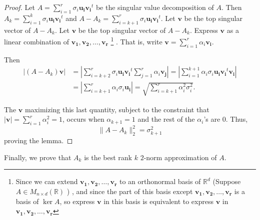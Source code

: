 \begin{proof}
  Let \(A=\sum_{i=1}^{r} \sigma _i \mathbf{u_i} \mathbf{v_i}^t\) be the singular value decomposition of \(A\). Then \(A_k = \sum_{i=1}^k \sigma _i \mathbf{u_i} \mathbf{v_i}^t\) and \(A-A_k = \sum_{i=k+1}^{r}  \sigma _i \mathbf{u_i} \mathbf{v_i}^t\). Let \(\mathbf{v} \) be the top singular vector of \(A - A_k\). Let \(\mathbf{v} \) be the top singular vector of \(A-A_k\). Express \(\mathbf{v} \) as a linear combination of \(\mathbf{v_1}, \mathbf{v_2}, \dots , \mathbf{v_r}\)   \footnote{Since we can extend \(\mathbf{v_1}, \mathbf{v_2}, \dots , \mathbf{v_r}   \) to an orthonormal basis of \(\mathbb{R} ^d\) (Suppose \(A \in M_{n \times d}(\mathbb{R})\) ) , and since the part of this basis except \(\mathbf{v_1}, \mathbf{v_2}, \dots , \mathbf{v_r}\) is a basis of \(\ker A\), so express \(\mathbf{v} \) in this basis is equivalent to express \(\mathbf{v} \) in \(\mathbf{v_1}, \mathbf{v_2}, \dots , \mathbf{v_r}\)    } . That is, write \(\mathbf{v} = \sum_{i=1}^{r} \alpha _i \mathbf{v_i}  \).
  
  Then
  \begin{align*}
    \vert (A-A_k)\mathbf{v}  \vert &= \left\vert \sum_{i=k+2}^{r}\sigma _i \mathbf{u_i} \mathbf{v_i}^t \sum_{j=1}^{r} \alpha _i \mathbf{v_j}      \right\vert = \left\vert \sum_{i=1}^{k+1} \alpha _i \sigma _i \mathbf{u_i} \mathbf{v_i}^t \mathbf{v_i}    \right\vert  \\
    &= \left\vert \sum_{i=k+1}^{r} \alpha _i \sigma _i \mathbf{u_i}   \right\vert = \sqrt{\sum_{i=k+1}^r \alpha _i^2\sigma _i^2 }. 
  \end{align*}         

  The \(\mathbf{v} \)  maximizing this last quantity, subject to the constraint that \(\vert \mathbf{v}  \vert = \sum_{i=1}^r \alpha _i^2 = 1  \), occurs when \(\alpha _{k+1}=1\) and the rest of the \(\alpha _i\)'s are \(0\). Thus,
  \[
    \lVert A-A_k \rVert_2^2 = \sigma _{k+1}^2 
  \]    proving the lemma.
\end{proof}

Finally, we prove that \(A_k\) is the best rank \(k\) \(2\)-norm approximation of \(A\).

